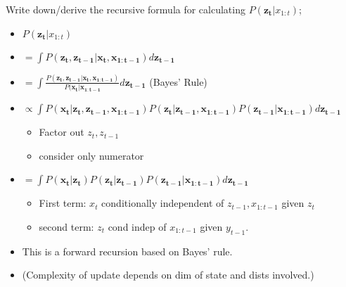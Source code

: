 \documentclass{article}
\begin{document}
Write down/derive the recursive formula for calculating $P(\mathbf{z_t}|x_{1:t})$; \begin{itemize} \item $P(\mathbf{z_t}|x_{1:t})$ \item $=\int P(\mathbf{z_t, z_{t-1}|x_t, x_{1:t-1}})d\mathbf{z_{t-1}}$ \item $=\int \frac{P(\mathbf{z_t, z_{t-1}|x_t, x_{1:t-1}})}{P(\mathbf{x_t|x_{1:t-1}}}d\mathbf{z_{t-1}}$ (Bayes' Rule) \item $\propto\int P(\mathbf{x_t| z_t, z_{t-1}, x_{1:t-1}})P(\mathbf{z_t|z_{t-1}, x_{1:t-1}}) P(\mathbf{z_{t-1}|x_{1:t-1}}) d\mathbf{z_{t-1}}$ \begin{itemize} \item Factor out $z_t, z_{t-1}$ \item consider only numerator \end{itemize} \item $=\int P(\mathbf{x_t| z_t})P(\mathbf{z_t|z_{t-1}}) P(\mathbf{z_{t-1}|x_{1:t-1}}) d\mathbf{z_{t-1}}$ \begin{itemize} \item First term: $x_t$ conditionally independent of $z_{t-1}, x_{1:t-1}$ given $z_t$ \item second term: $z_t$ cond indep of $x_{1:t-1}$ given $y_{t-1}$. \end{itemize} \item This is a forward recursion based on Bayes' rule.  \item (Complexity of update depends on dim of state and dists involved.) \end{itemize}
\end{document}
